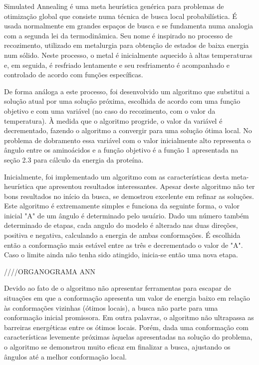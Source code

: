 \documentclass[dm,ppgcomp]{texfurg}
\begin{document}
Simulated Annealing é uma meta heurística genérica para problemas de otimização global que consiste numa técnica de busca local probabilística. É usada normalmente em grandes espaços de busca e se fundamenta numa analogia com a segunda lei da termodinâmica. Seu nome é inspirado no processo de recozimento, utilizado em metalurgia para obtenção de estados de baixa energia num sólido. Neste processo, o metal é inicialmente aquecido à altas temperaturas e, em seguida, é resfriado lentamente e seu resfriamento é acompanhado e controlado de acordo com funções específicas. 

De forma análoga a este processo, foi desenvolvido um algoritmo que substitui a solução atual por uma solução próxima, escolhida de acordo com uma função objetivo e com uma variável (no caso do recozimento, com o valor da temperatura). À medida que o algoritmo progride, o valor da variável é decrementado, fazendo o algoritmo a convergir para uma solução ótima local. No problema de dobramento essa variável com o valor inicialmente alto representa o ângulo entre os aminoácidos e a função objetivo é a função 1 apresentada na seção 2.3  para cálculo da energia da proteína.

Inicialmente, foi implementado um algoritmo com as características desta meta-heurística que apresentou resultados interessantes. Apesar deste algoritmo não ter bons resultados no início da busca, se demostrou excelente em refinar as soluções. Este algoritmo é extremamente simples e funciona da seguinte forma, o valor inicial "A" de um ângulo é determinado pelo usuário. Dado um número também determinado de etapas, cada angulo do modelo é alterado nas duas direções, positiva e negativa, calculando a energia de ambas conformações. É escolhida então a conformação mais estável entre as três e decrementado o valor de "A". Caso o limite ainda não tenha sido atingido, inicia-se então uma nova etapa.


////ORGANOGRAMA ANN



Devido ao fato de o algoritmo não apresentar ferramentas para escapar de situações em que a conformação apresenta um valor de energia baixo em relação às conformações vizinhas (ótimos locais), a busca não parte para uma conformação inicial promissora. Em outra palavras, o algoritmo não ultrapassa as barreiras energéticas entre os ótimos locais. Porém, dada uma conformação com características levemente próximas àquelas apresentadas na solução do problema, o algoritmo se demonstrou muito eficaz em finalizar a busca, ajustando os ângulos até a melhor conformação local.
\end{document}
